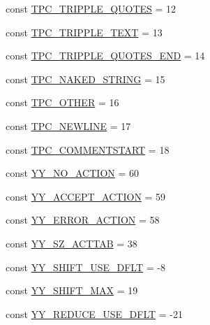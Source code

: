 \begin{DoxyCompactItemize}
const \hyperlink{class_smarty___internal___configfileparser_a1432284fc3fba838f21300cf47b67236}{T\+P\+C\+\_\+\+T\+R\+I\+P\+P\+L\+E\+\_\+\+Q\+U\+O\+T\+E\+S} = 12
\item 
const \hyperlink{class_smarty___internal___configfileparser_ae9cba29f413166969ed55bc9105893a6}{T\+P\+C\+\_\+\+T\+R\+I\+P\+P\+L\+E\+\_\+\+T\+E\+X\+T} = 13
\item 
const \hyperlink{class_smarty___internal___configfileparser_aa6973bfe949fcdae9cee9287bcd836a3}{T\+P\+C\+\_\+\+T\+R\+I\+P\+P\+L\+E\+\_\+\+Q\+U\+O\+T\+E\+S\+\_\+\+E\+N\+D} = 14
\item 
const \hyperlink{class_smarty___internal___configfileparser_add693f167a57849cf47c5c69d406b625}{T\+P\+C\+\_\+\+N\+A\+K\+E\+D\+\_\+\+S\+T\+R\+I\+N\+G} = 15
\item 
const \hyperlink{class_smarty___internal___configfileparser_ac821c655ef0e4cd85dd17747d4d4161a}{T\+P\+C\+\_\+\+O\+T\+H\+E\+R} = 16
\item 
const \hyperlink{class_smarty___internal___configfileparser_ad01beb2d545e6e307dde106434f87ab4}{T\+P\+C\+\_\+\+N\+E\+W\+L\+I\+N\+E} = 17
\item 
const \hyperlink{class_smarty___internal___configfileparser_ad94e24a624834df958babfb4fe80cdad}{T\+P\+C\+\_\+\+C\+O\+M\+M\+E\+N\+T\+S\+T\+A\+R\+T} = 18
\item 
const \hyperlink{class_smarty___internal___configfileparser_a0f6c1861a270043cc4facee4f97d95bb}{Y\+Y\+\_\+\+N\+O\+\_\+\+A\+C\+T\+I\+O\+N} = 60
\item 
const \hyperlink{class_smarty___internal___configfileparser_a5b4b8af3d51108107c7a732327bf5cbe}{Y\+Y\+\_\+\+A\+C\+C\+E\+P\+T\+\_\+\+A\+C\+T\+I\+O\+N} = 59
\item 
const \hyperlink{class_smarty___internal___configfileparser_a86105f08ea37e26f27d0eae2f6b6085c}{Y\+Y\+\_\+\+E\+R\+R\+O\+R\+\_\+\+A\+C\+T\+I\+O\+N} = 58
\item 
const \hyperlink{class_smarty___internal___configfileparser_a8b22de670a250b89ee356adaa5596a7a}{Y\+Y\+\_\+\+S\+Z\+\_\+\+A\+C\+T\+T\+A\+B} = 38
\item 
const \hyperlink{class_smarty___internal___configfileparser_a90aa463165c0ae2cb3a4b5dc9721144e}{Y\+Y\+\_\+\+S\+H\+I\+F\+T\+\_\+\+U\+S\+E\+\_\+\+D\+F\+L\+T} = -\/8
\item 
const \hyperlink{class_smarty___internal___configfileparser_ae00d9e9833807771c3e0b127ff721b11}{Y\+Y\+\_\+\+S\+H\+I\+F\+T\+\_\+\+M\+A\+X} = 19
\item 
const \hyperlink{class_smarty___internal___configfileparser_a85522f46f7d2d177a785637737c20af2}{Y\+Y\+\_\+\+R\+E\+D\+U\+C\+E\+\_\+\+U\+S\+E\+\_\+\+D\+F\+L\+T} = -\/21

\end{DoxyCompactItemize}

